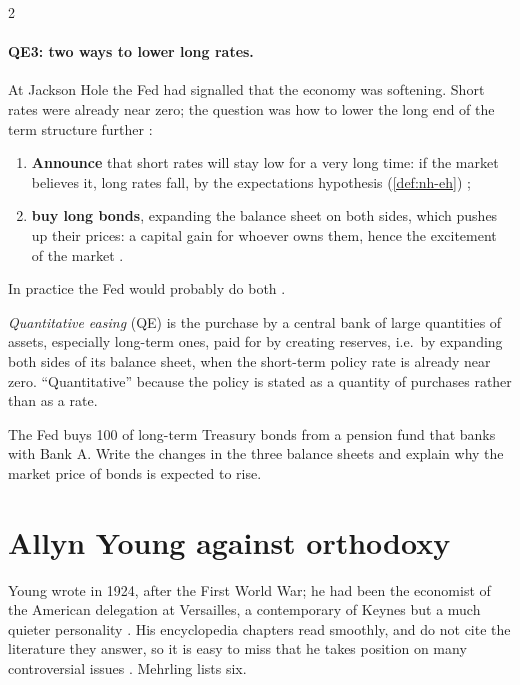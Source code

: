 \begin{paracol}{2}
\paragraph{QE3: two ways to lower long rates.} At Jackson Hole the Fed had signalled that the economy was softening. Short
rates were already near zero; the question was how to lower the long end of the term structure further
:
\begin{enumerate}
  \item \textbf{Announce} that short rates will stay low for a very long time: if the market believes it, long rates fall, by the
        expectations hypothesis (\cref{def:nh-eh}) ;
  \item \textbf{buy long bonds}, expanding the balance sheet on both sides, which pushes up their prices: a capital gain for
        whoever owns them, hence the excitement of the market .
\end{enumerate}
In practice the Fed would probably do both .

\begin{definition}
\emph{Quantitative easing} (QE) is the purchase by a central bank of large quantities of assets, especially long-term ones,
paid for by creating reserves, i.e.\ by expanding both sides of its balance sheet, when the short-term policy rate is already
near zero. ``Quantitative'' because the policy is stated as a quantity of purchases rather than as a rate.
\end{definition}

\begin{exercise}[QE in T-accounts]
The Fed buys 100 of long-term Treasury bonds from a pension fund that banks with Bank A. Write the changes in the three balance sheets and
explain why the market price of bonds is expected to rise.
\end{exercise}

\section{Allyn Young against orthodoxy}\label{sec:st-young}

Young wrote in 1924, after the First World War; he had been the economist of the American delegation at Versailles, a
contemporary of Keynes but a much quieter personality . His encyclopedia chapters read
smoothly, and do not cite the literature they answer, so it is easy to miss that he takes position on many controversial
issues . Mehrling lists six.


\end{paracol}
